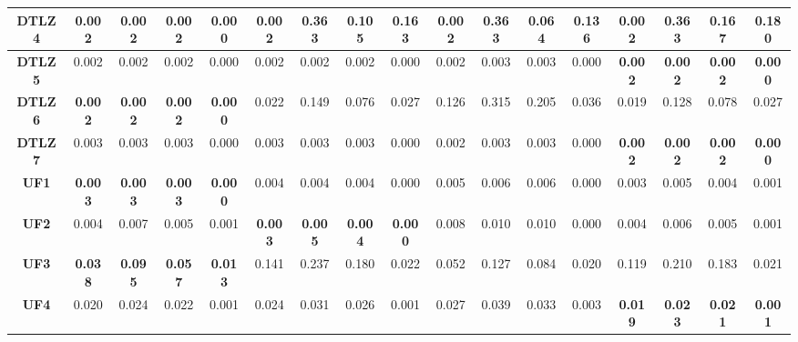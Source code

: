 \begin{table*}[t]
{\begin{tabular}{cc|c|c|c|c|c|c|c|c|c|c|c|c|c|c|c}
\multicolumn{1}{c|}{\textbf{DTLZ4}} & \textbf{0.002} & \textbf{0.002} & \textbf{0.002} & \textbf{0.000} & 0.002          & 0.363          & 0.105          & 0.163          & 0.002          & 0.363          & 0.064          & 0.136          & 0.002          & 0.363          & 0.167          & 0.180          \\ \hline
\multicolumn{1}{c|}{\textbf{DTLZ5}} & 0.002          & 0.002          & 0.002          & 0.000          & 0.002          & 0.002          & 0.002          & 0.000          & 0.002          & 0.003          & 0.003          & 0.000          & \textbf{0.002} & \textbf{0.002} & \textbf{0.002} & \textbf{0.000} \\ \hline
\multicolumn{1}{c|}{\textbf{DTLZ6}} & \textbf{0.002} & \textbf{0.002} & \textbf{0.002} & \textbf{0.000} & 0.022          & 0.149          & 0.076          & 0.027          & 0.126          & 0.315          & 0.205          & 0.036          & 0.019          & 0.128          & 0.078          & 0.027          \\ \hline
\multicolumn{1}{c|}{\textbf{DTLZ7}} & 0.003          & 0.003          & 0.003          & 0.000          & 0.003          & 0.003          & 0.003          & 0.000          & 0.002          & 0.003          & 0.003          & 0.000          & \textbf{0.002} & \textbf{0.002} & \textbf{0.002} & \textbf{0.000} \\ \hline
\multicolumn{1}{c|}{\textbf{UF1}}   & \textbf{0.003} & \textbf{0.003} & \textbf{0.003} & \textbf{0.000} & 0.004          & 0.004          & 0.004          & 0.000          & 0.005          & 0.006          & 0.006          & 0.000          & 0.003          & 0.005          & 0.004          & 0.001          \\ \hline
\multicolumn{1}{c|}{\textbf{UF2}}   & 0.004          & 0.007          & 0.005          & 0.001          & \textbf{0.003} & \textbf{0.005} & \textbf{0.004} & \textbf{0.000} & 0.008          & 0.010          & 0.010          & 0.000          & 0.004          & 0.006          & 0.005          & 0.001          \\ \hline
\multicolumn{1}{c|}{\textbf{UF3}}   & \textbf{0.038} & \textbf{0.095} & \textbf{0.057} & \textbf{0.013} & 0.141          & 0.237          & 0.180          & 0.022          & 0.052          & 0.127          & 0.084          & 0.020          & 0.119          & 0.210          & 0.183          & 0.021          \\ \hline
\multicolumn{1}{c|}{\textbf{UF4}}   & 0.020          & 0.024          & 0.022          & 0.001          & 0.024          & 0.031          & 0.026          & 0.001          & 0.027          & 0.039          & 0.033          & 0.003          & \textbf{0.019} & \textbf{0.023} & \textbf{0.021} & \textbf{0.001} \\ \hline

\end{tabular}}
\end{table*}
